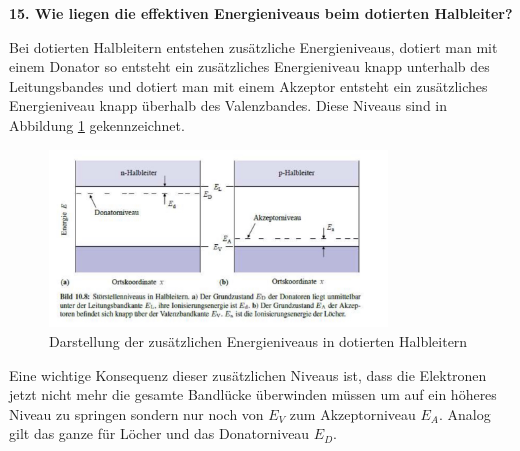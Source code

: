 \noindent\textbf{15. Wie liegen die effektiven Energieniveaus beim dotierten Halbleiter?}\\
\begin{addmargin}[25pt]{0pt}
Bei dotierten Halbleitern entstehen zusätzliche Energieniveaus, dotiert man mit einem Donator so entsteht ein zusätzliches Energieniveau knapp unterhalb des Leitungsbandes und dotiert man mit einem Akzeptor entsteht ein zusätzliches Energieniveau knapp überhalb des Valenzbandes. Diese Niveaus sind in Abbildung \ref{fig:Energieniveaus_Halbleiter} gekennzeichnet.
\begin{figure}[h]
    \centering
    \includegraphics[width = 0.8\textwidth]{images/KM2/Donator_Akzeptorniveaus.jpeg}
    \caption{Darstellung der zusätzlichen Energieniveaus in dotierten Halbleitern}
    \label{fig:Energieniveaus_Halbleiter}
\end{figure}
Eine wichtige Konsequenz dieser zusätzlichen Niveaus ist, dass die Elektronen jetzt nicht mehr die gesamte Bandlücke überwinden müssen um auf ein höheres Niveau zu springen sondern nur noch von $E_V$ zum Akzeptorniveau $E_A$. Analog gilt das ganze für Löcher und das Donatorniveau $E_D$.
\end{addmargin}

